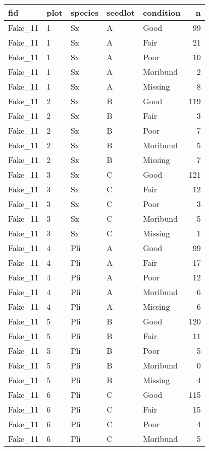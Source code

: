 \documentclass[
]{article}
\begin{document}
\begin{tabular}{l|l|l|l|l|r}
\hline
fid & plot & species & seedlot & condition & n\\
\hline
Fake\_11 & 1 & Sx & A & Good & 99\\
\hline
Fake\_11 & 1 & Sx & A & Fair & 21\\
\hline
Fake\_11 & 1 & Sx & A & Poor & 10\\
\hline
Fake\_11 & 1 & Sx & A & Moribund & 2\\
\hline
Fake\_11 & 1 & Sx & A & Missing & 8\\
\hline
Fake\_11 & 2 & Sx & B & Good & 119\\
\hline
Fake\_11 & 2 & Sx & B & Fair & 3\\
\hline
Fake\_11 & 2 & Sx & B & Poor & 7\\
\hline
Fake\_11 & 2 & Sx & B & Moribund & 5\\
\hline
Fake\_11 & 2 & Sx & B & Missing & 7\\
\hline
Fake\_11 & 3 & Sx & C & Good & 121\\
\hline
Fake\_11 & 3 & Sx & C & Fair & 12\\
\hline
Fake\_11 & 3 & Sx & C & Poor & 3\\
\hline
Fake\_11 & 3 & Sx & C & Moribund & 5\\
\hline
Fake\_11 & 3 & Sx & C & Missing & 1\\
\hline
Fake\_11 & 4 & Pli & A & Good & 99\\
\hline
Fake\_11 & 4 & Pli & A & Fair & 17\\
\hline
Fake\_11 & 4 & Pli & A & Poor & 12\\
\hline
Fake\_11 & 4 & Pli & A & Moribund & 6\\
\hline
Fake\_11 & 4 & Pli & A & Missing & 6\\
\hline
Fake\_11 & 5 & Pli & B & Good & 120\\
\hline
Fake\_11 & 5 & Pli & B & Fair & 11\\
\hline
Fake\_11 & 5 & Pli & B & Poor & 5\\
\hline
Fake\_11 & 5 & Pli & B & Moribund & 0\\
\hline
Fake\_11 & 5 & Pli & B & Missing & 4\\
\hline
Fake\_11 & 6 & Pli & C & Good & 115\\
\hline
Fake\_11 & 6 & Pli & C & Fair & 15\\
\hline
Fake\_11 & 6 & Pli & C & Poor & 4\\
\hline
Fake\_11 & 6 & Pli & C & Moribund & 5\\

\end{tabular}
\end{document}
